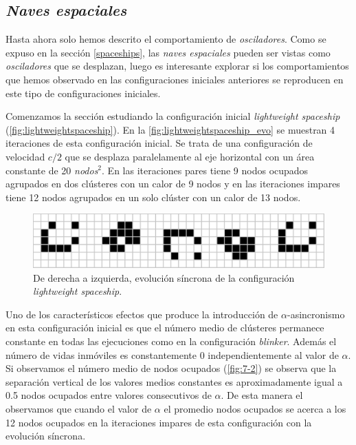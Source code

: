 \documentclass[../proyecto.tex]{memoir}
\begin{document}
\subsection{\textit{Naves espaciales}}
Hasta ahora solo hemos descrito el comportamiento de \textit{osciladores}. Como se expuso en la sección \ref{spaceships}, las \textit{naves espaciales} pueden ser vistas como \textit{osciladores} que se desplazan, luego es interesante explorar si los comportamientos que hemos observado en las configuraciones iniciales anteriores se reproducen en este tipo de configuraciones iniciales. 

Comenzamos la sección estudiando la configuración inicial \textit{lightweight spaceship} (\autoref{fig:lightweightspaceship}). En la \autoref{fig:lightweightspaceship_evo} se muestran 4 iteraciones de esta configuración inicial. Se trata de una configuración de velocidad $c/2$ que se desplaza paralelamente al eje horizontal con un área constante de 20 \textit{nodos}$^2$. En las iteraciones pares tiene 9 nodos ocupados agrupados en dos clústeres con un calor de 9 nodos y en las iteraciones impares tiene 12 nodos agrupados en un solo clúster con un calor de 13 nodos.

\begin{figure}[H]
	\centering
    \includegraphics[width=\textwidth]{./images/lightweightspaceship_evo.png}
    \caption{De derecha a izquierda, evolución síncrona de la configuración \textit{lightweight spaceship}.}
    \label{fig:lightweightspaceship_evo}
\end{figure}

Uno de los característicos efectos que produce la introducción de $\alpha$-asincronismo en esta configuración inicial es que el número medio de clústeres permanece constante en todas las ejecuciones como en la configuración \textit{blinker}. Además el número de vidas inmóviles es constantemente 0 independientemente al valor de $\alpha$. Si observamos el número medio de nodos ocupados (\autoref{fig:7-2}) se observa que la separación vertical de los valores medios constantes es aproximadamente igual a 0.5 nodos ocupados entre valores consecutivos de $\alpha$. De esta manera el observamos que cuando el valor de $\alpha$ el promedio nodos ocupados se acerca a los 12 nodos ocupados en la iteraciones impares de esta configuración con la evolución síncrona.
\end{document}
